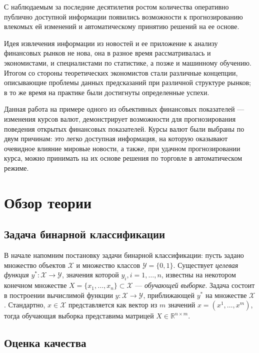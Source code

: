 \documentclass[14pt,a4paper]{extreport}
\begin{document}
С наблюдаемым за последние десятилетия ростом количества оперативно публично доступной информации появились возможности к прогнозированию влекомых ей изменений
и автоматическому принятию решений на ее основе.

Идея извлечения информации из новостей и ее приложение к анализу финансовых рынков не нова, она
в разное время рассматривалась и экономистами, и специалистами по статистике, а позже и машинному обучению.
Итогом со стороны теоретических экономистов стали различные концепции,
описывающие проблемы данных предсказаний при различной структуре рынков; в то же время на практике
были достигнуты определенные успехи.

Данная работа на примере одного из объективных финансовых показателей --- изменения курсов валют, демонстрирует возможности для прогнозирования поведения открытых финансовых показателей.
Курсы валют были выбраны по двум причинам: это легко доступная информация,
на которую оказывают очевидное влияние мировые новости, а также, при удачном прогнозировании курса, можно принимать на их основе решения по торговле в автоматическом режиме.

\tableofcontents

\chapter{Обзор теории}

\section{Задача бинарной классификации}

В начале напомним постановку задачи бинарной классификации\cite{bin_classif}: пусть задано множество объектов $\mathcal{X}$ и
множество классов $\mathcal{Y} = \{0,1\}$.  Существует \textit{целевая функция} $y^*:\mathcal{X}\to\mathcal{Y}$,
значения которой $y_i, i=1,\ldots,n$, известны на некотором конечном множестве
$X = \{x_1,\ldots,x_n\} \subset \mathcal{X}$ --- \textit{обучающей выборке}. Задача состоит в построении вычислимой функции
$y:\mathcal{X}\to\mathcal{Y}$, приближающей $y^*$ на множестве $\mathcal{X}$.
Стандартно, $x\in\mathcal{X}$ представляется как вектор из $m$ значений $x=(x^1,\ldots,x^m)$, тогда обучающая выборка
представима матрицей $X\in \mathbb{R}^{n\times m}$.

\section{Оценка качества}
\end{document}
